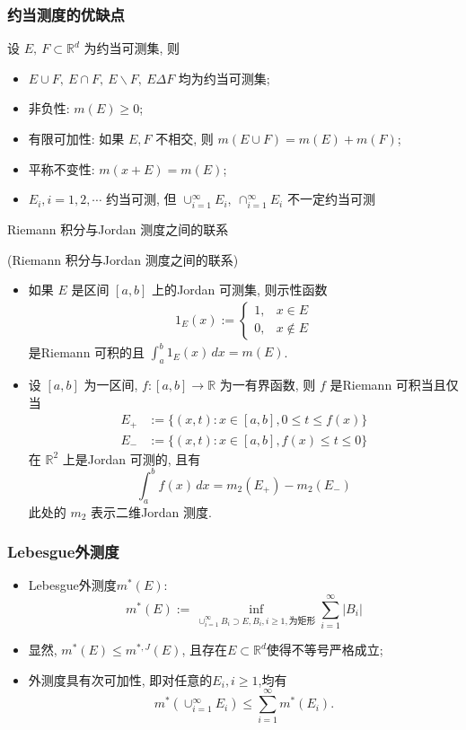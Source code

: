 \documentclass[Prob-All.tex]{subfiles}
\begin{document}
\begin{frame}
	\frametitle{约当测度的优缺点}
	设 $E,\  F\subset\mathbb{R}^d$ 为约当可测集, 则
	\begin{itemize}[<+-|alert@+>]
		\item $E\cup F,\  E\cap F,\  E\backslash F,\  E\Delta F$ 均为约当可测集;
		\item 非负性: $m(E)\geq 0$;
		\item 有限可加性: 如果 $E, F$ 不相交, 则 $m(E\cup F)=m(E)+m(F)$;
		\item 平称不变性: $m(x+E)=m(E)$;
		\item $E_i, i=1,2,\cdots$ 约当可测, 但 $\cup_{i=1}^\infty E_i, \  \cap_{i=1}^\infty E_i$ 不一定约当可测
	\end{itemize}
\end{frame}

\begin{frame}{{\rm Riemann }积分与{\rm Jordan} 测度之间的联系}
\begin{thm}({\rm Riemann }积分与{\rm Jordan} 测度之间的联系)
	\begin{itemize}
		\item  如果 $E$ 是区间 $[a,b]$ 上的{\rm Jordan} 可测集, 则示性函数
		\begin{align*}
			1_{E}(x):=\left\{\begin{array}{ll}
				1, & x\in E \\ 0, & x\notin E \end{array}\right.
		\end{align*}
		是{\rm Riemann } 可积的且 $\int_{a}^b{1}_{E}(x) \, dx=m(E)$.
		\item  设 $[a,b]$ 为一区间, $f:[a,b]\rightarrow \mathbb{R}$ 为一有界函数, 则 $f$ 是{\rm Riemann }可积当且仅当
		\begin{align}
			E_+ &:=\{(x,t):x\in[a,b], 0\leq t\leq f(x)\}\\ E_-&:=\{(x,t):x\in[a,b], f(x)\leq t\leq 0\}
		\end{align}
		在 $\mathbb{R}^2$ 上是{\rm Jordan} 可测的, 且有
		$$\int_{a}^b f(x)  \, dx=m_{2}(E_{+})-m_{2}(E_{-}) $$
		此处的 $m_{2}$ 表示二维{\rm Jordan}  测度.
	\end{itemize}

\end{thm}
\end{frame}

\begin{frame}
	\frametitle{{\rm Lebesgue}外测度}

	\begin{itemize}[<+-|alert@+>]
		\item{\rm Lebesgue}外测度$m^*(E)$:
		\[m^*(E):=\inf_{\cup_{i=1}^\infty B_i\supset E, B_i, i\geq 1, \mbox{为矩形}}\sum_{i=1}^\infty |B_i|\]
		\item 显然, $m^*(E)\leq m^{*,J}(E)$, 且存在$E\subset\mathbb{R}^d$使得不等号严格成立;
		\item 外测度具有次可加性, 即对任意的$E_i, i\geq 1$,均有
		$$m^*(\cup_{i=1}^\infty E_i)\leq \sum_{i=1}^\infty m^*(E_i).$$

	\end{itemize}
\end{frame}
\end{document}
